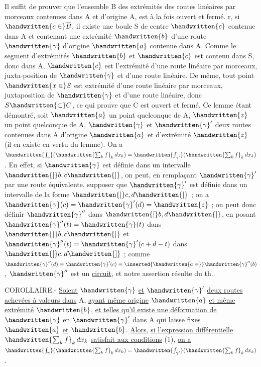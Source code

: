 Il suffit de prouver que l'ensemble B des extrémités des routes linéaires par morceaux contenues dans A et d'origine A, est à la fois ouvert et fermé. r, si $\handwritten{c\in}\overline{B}$, il existe une boule S de centre $\handwritten{c}$ contenue dans A et contenant une extrémité $\handwritten{b}$ d'une route $\handwritten{\gamma}$ d'origine $\handwritten{a}$ contenue dans A. Comme le segment d'extrémités $\handwritten{b}$ et $\handwritten{c}$ est contenu dans S, donc dans A, $\handwritten{c}$ est l'extrémité d'une route linéaire par morceaux, juxta-position de $\handwritten{\gamma}$ et d'une route linéaire. De même, tout point $\handwritten{x\in}S$ est extrémité d'une route linéaire par morceaux, juxtaposition de $\handwritten{\gamma}$ et d'une route linéaire, donc $S\handwritten{\subset}C$, ce qui prouve que C est ouvert et fermé. Ce lemme étant démontré, soit $\handwritten{a}$ un point quelconque de A, $\handwritten{z}$ un point quelconque de A, $\handwritten{\gamma}$ et $\handwritten{\gamma}'$ deux routes contenues dans A d'origine $\handwritten{a}$ et d'extrémité $\handwritten{z}$ (il en existe en vertu du lemme). On a $\handwritten{\int_\gamma}(\handwritten{\sum_k f}_k\,dx_k)=\handwritten{\int_{\gamma'}}(\handwritten{\sum_k f}_k\,dx_k)$. En effet, si $\handwritten{\gamma}$ est définie dans un intervalle $\handwritten{[}b,c\handwritten{]}$, on peut, en remplaçant $\handwritten{\gamma}'$ par une route équivalente, supposer que $\handwritten{\gamma}'$ est définie dans un intervalle de la forme $\handwritten{[}c,d\handwritten{]}$ ; on a $\handwritten{\gamma}(c)=\handwritten{\gamma}'(d)=\handwritten{z}$ ; on peut donc définir $\handwritten{\gamma}''$ dans $\handwritten{[}b,d\handwritten{]}$, en posant $\handwritten{\gamma}''(t)=\handwritten{\gamma}(t)$ dans $\handwritten{[}b,c\handwritten{]}$ et $\handwritten{\gamma}''(t)=\handwritten{\gamma}'(c+d-t)$ dans $\handwritten{[}c,d\handwritten{]}$ ; comme $\handwritten{\gamma}''(d)=\handwritten{\gamma}'(c)=\inserted{\handwritten{a=}}\handwritten{\gamma}''(b)$, $\handwritten{\gamma}''$ est un \uline{circuit}, et notre assertion résulte du th..



COROLLAIRE.- \uline{Soient} $\handwritten{\gamma}$ \uline{et} $\handwritten{\gamma}'$ \uline{deux routes achevées à valeurs dans} A, \uline{ayant même origine} $\handwritten{a}$ \uline{et même extrémité} $\handwritten{b}$, \uline{et telles qu'il existe une déformation de} $\handwritten{\gamma}$ \uline{en} $\handwritten{\gamma}'$ \uline{dans} A \uline{qui laisse fixes} $\handwritten{a}$ \uline{et} $\handwritten{b}$. \uline{Alors}, \uline{si l'expression différentielle} $\handwritten{\sum_k f}_k\,dx_k$ \uline{satisfait aux conditions} (1), \uline{on a} $\handwritten{\int_\gamma}(\handwritten{\sum_k f}_k\,dx_k)=\handwritten{\int_{\gamma'}}(\handwritten{\sum_k f}_k\,dx_k)$.

